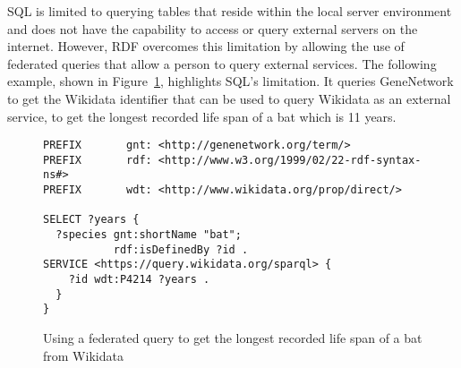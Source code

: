 SQL is limited to querying tables that reside within the local server environment and does not have the capability to access or query external servers on the internet.  However, RDF overcomes this limitation by allowing the use of federated queries that allow a person to query external services.  The following example, shown in Figure~\ref{sparql:federated}, highlights SQL's limitation.  It queries GeneNetwork to get the Wikidata identifier that can be used to query Wikidata as an external service, to get the longest recorded life span of a bat which is 11 years.

\begin{figure}[H]
\centering
\begin{verbatim}
PREFIX       gnt: <http://genenetwork.org/term/>
PREFIX       rdf: <http://www.w3.org/1999/02/22-rdf-syntax-ns#>
PREFIX       wdt: <http://www.wikidata.org/prop/direct/>

SELECT ?years {
  ?species gnt:shortName "bat";
           rdf:isDefinedBy ?id .
SERVICE <https://query.wikidata.org/sparql> {
    ?id wdt:P4214 ?years .
  }
}
\end{verbatim}
\caption{Using a federated query to get the longest recorded life span of a bat from Wikidata}\label{sparql:federated}
\end{figure}
